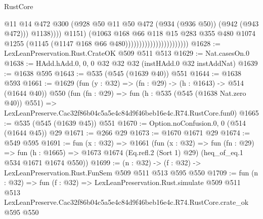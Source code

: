 \begin{lexlean}{RustCore}
\begin{coremodule}
                                                      @11
                                                      @14
                                                      @472
                                                      @300
                                                      (@928
                                                        @50
                                                        @11
                                                        @50
                                                        @472
                                                        (@934 (@936 @50))
                                                        (@942 (@943 @472)))
                                                      @1138))))
                                              @1151)
                                            (@1063
                                              @168
                                              @66
                                              @118
                                              @15
                                              @283
                                              @355
                                              @480
                                              @1074
                                              @1255
                                              (@1145 (@1147 @168 @66 @480)))))))))))))))))))))))
@1628 := LexLeanPreservation.Rust.CrateOK @509 @511 @513
@1629 := Nat.casesOn.{0}
@1638 := HAdd.hAdd.{0, 0, 0} @32 @32 @32 (instHAdd.{0} @32 instAddNat)
@1639 := @1638 @595
@1643 := @535 (@545 (@1639 @40)) @551
@1644 := @1638 @593
@1661 := @1629
    (fun (y : @32) => (fn : @29) -> (h : @1643) -> @514 (@1644 @40))
    @550
    (fun (fn : @29) =>
    fun (h : @535 (@545 (@1638 Nat.zero @40)) @551) =>
    LexLeanPreserve.Cac32f86b04c5a5e4c84d9f46beb16e4c.R74.RustCore.fun0)
@1665 := @535 (@545 (@1639 @45)) @551
@1670 := Option.noConfusion.{0, 0} (@514 (@1644 @45)) @29
@1671 := @266 @29
@1673 := @1670 @1671 @29
@1674 := @549 @595
@1691 := fun (x : @32) =>
  @1661
    (fun (x : @32) =>
    fun (fn : @29) =>
    fun (h : @1665) => @1673 @1674 (Eq.refl.{2} (Sort 1) @29) (heq_of_eq.{1} @534 @1671 @1674 @550))
@1699 := (n : @32) -> (f : @32) -> LexLeanPreservation.Rust.FunSem @509 @511 @513 @595 @550
@1709 := fun (n : @32) =>
  fun (f : @32) =>
  LexLeanPreservation.Rust.simulate
    @509
    @511
    @513
    LexLeanPreserve.Cac32f86b04c5a5e4c84d9f46beb16e4c.R74.RustCore.crate_ok
    @595
    @550
\end{coremodule}
\end{lexlean}
